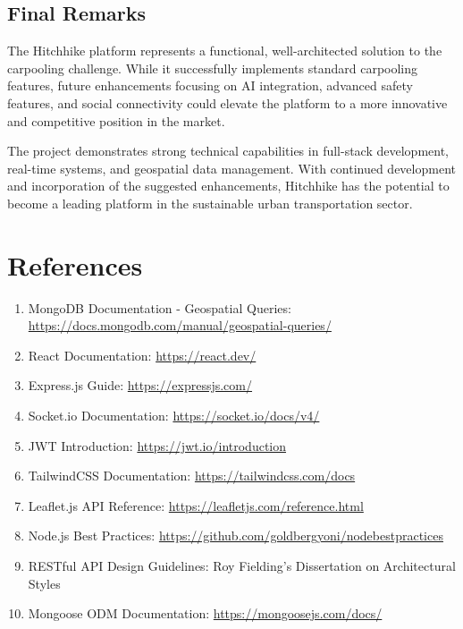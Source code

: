 \documentclass[12pt,a4paper]{article}
\begin{document}
\subsection{Final Remarks}

The Hitchhike platform represents a functional, well-architected solution to the carpooling challenge. While it successfully implements standard carpooling features, future enhancements focusing on AI integration, advanced safety features, and social connectivity could elevate the platform to a more innovative and competitive position in the market.

The project demonstrates strong technical capabilities in full-stack development, real-time systems, and geospatial data management. With continued development and incorporation of the suggested enhancements, Hitchhike has the potential to become a leading platform in the sustainable urban transportation sector.

\newpage

\section*{References}

\begin{enumerate}
    \item MongoDB Documentation - Geospatial Queries: \url{https://docs.mongodb.com/manual/geospatial-queries/}
    \item React Documentation: \url{https://react.dev/}
    \item Express.js Guide: \url{https://expressjs.com/}
    \item Socket.io Documentation: \url{https://socket.io/docs/v4/}
    \item JWT Introduction: \url{https://jwt.io/introduction}
    \item TailwindCSS Documentation: \url{https://tailwindcss.com/docs}
    \item Leaflet.js API Reference: \url{https://leafletjs.com/reference.html}
    \item Node.js Best Practices: \url{https://github.com/goldbergyoni/nodebestpractices}
    \item RESTful API Design Guidelines: Roy Fielding's Dissertation on Architectural Styles
    \item Mongoose ODM Documentation: \url{https://mongoosejs.com/docs/}
\end{enumerate}
\end{document}
